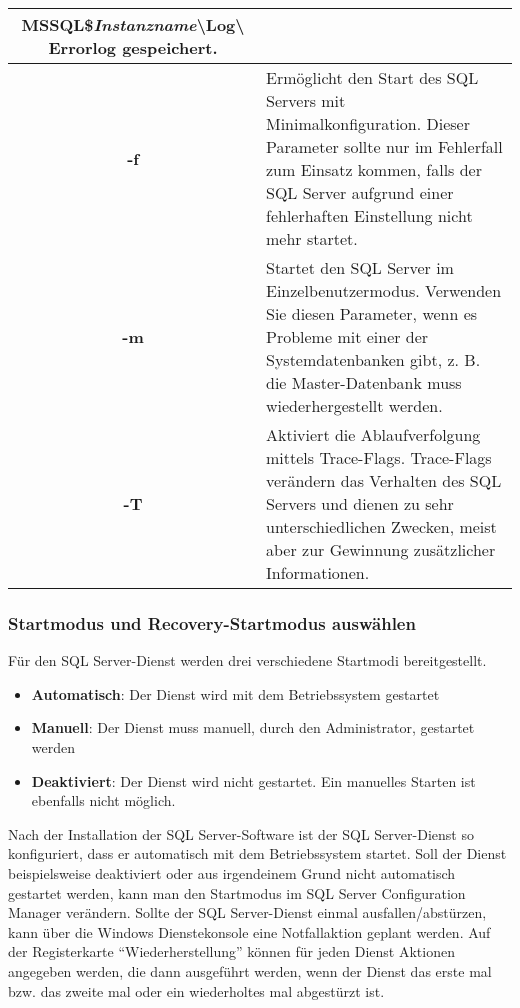 \begin{center}
\begin{small}
\begin{supertabular}{|c|p{10cm}|}
{                MSSQL\$\textit{Instanzname}\textbackslash Log\textbackslash
                Errorlog} gespeichert.\\
                \hline
                \textbf{-f} & Ermöglicht den Start des SQL Servers mit
                Minimalkonfiguration. Dieser Parameter sollte nur im
                Fehlerfall zum Einsatz kommen, falls der SQL Server aufgrund
                einer fehlerhaften Einstellung nicht mehr startet.\\
                \hline
                \textbf{-m} & Startet den SQL Server im Einzelbenutzermodus.
                Verwenden Sie diesen Parameter, wenn es Probleme mit einer der
                Systemdatenbanken gibt, z. B. die Master-Datenbank muss
                wiederhergestellt werden.\\
                \hline
                \textbf{-T} & Aktiviert die Ablaufverfolgung mittels
                Trace-Flags. Trace-Flags verändern das Verhalten des SQL
                Servers und dienen zu sehr unterschiedlichen Zwecken, meist
                aber zur Gewinnung zusätzlicher Informationen.\\
              \end{supertabular}
            \end{small}
          \end{center}
        \subsubsection{Startmodus und Recovery-Startmodus auswählen}
          Für den SQL Server-Dienst werden drei verschiedene Startmodi
          bereitgestellt.
          \begin{itemize}
              \item \textbf{Automatisch}: Der Dienst wird mit dem Betriebssystem
              gestartet
              \item \textbf{Manuell}: Der Dienst muss manuell, durch den
              Administrator, gestartet werden
              \item \textbf{Deaktiviert}: Der Dienst wird nicht gestartet. Ein
              manuelles Starten ist ebenfalls nicht möglich.
          \end{itemize}
          Nach der Installation der SQL Server-Software ist der
          SQL Server-Dienst so konfiguriert, dass er automatisch mit dem
          Betriebssystem startet. Soll der Dienst beispielsweise deaktiviert
          oder aus irgendeinem Grund nicht automatisch gestartet werden, kann
          man den Startmodus im SQL Server Configuration Manager verändern.
\clearpage
          Sollte der SQL Server-Dienst einmal ausfallen/abstürzen, kann über die
          Windows Dienstekonsole eine Notfallaktion geplant werden. Auf der
          Registerkarte \enquote{Wiederherstellung} können für jeden Dienst
          Aktionen angegeben werden, die dann ausgeführt werden, wenn der Dienst
          das erste mal bzw. das zweite mal oder ein wiederholtes mal abgestürzt
          ist.
          

